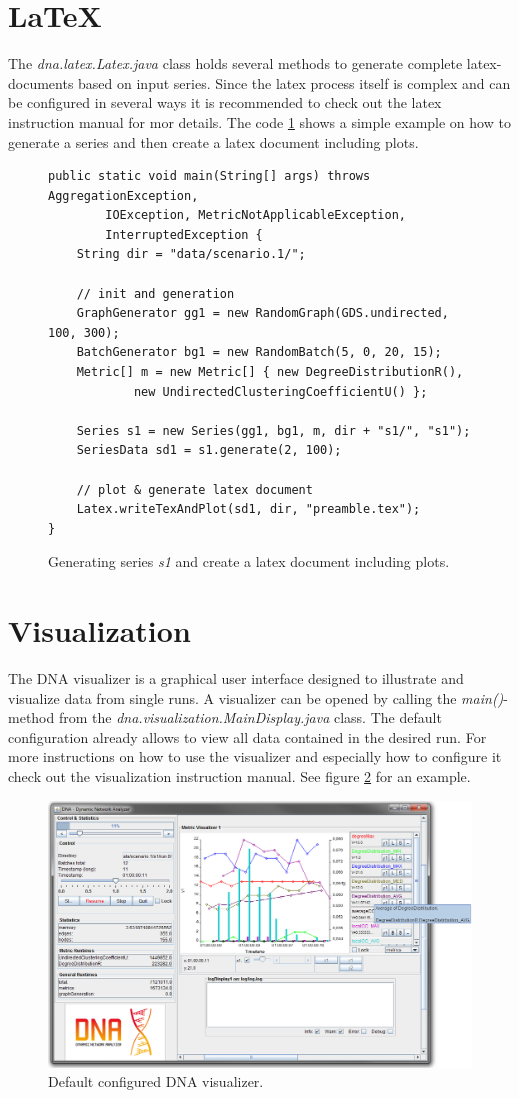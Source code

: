 \section{LaTeX}
The \textit{dna.latex.Latex.java} class holds several methods to generate complete latex-documents based on input series. Since the latex process itself is complex and can be configured in several ways it is recommended to check out the latex instruction manual for mor details. The code \ref{code:tex-example} shows a simple example on how to generate a series and then create a latex document including plots.
\begin{figure} [h]
\begin{lstlisting}
public static void main(String[] args) throws AggregationException,
		IOException, MetricNotApplicableException,
		InterruptedException {
	String dir = "data/scenario.1/";
	
	// init and generation
	GraphGenerator gg1 = new RandomGraph(GDS.undirected, 100, 300);
	BatchGenerator bg1 = new RandomBatch(5, 0, 20, 15);
	Metric[] m = new Metric[] { new DegreeDistributionR(),
			new UndirectedClusteringCoefficientU() };

	Series s1 = new Series(gg1, bg1, m, dir + "s1/", "s1");
	SeriesData sd1 = s1.generate(2, 100);

	// plot & generate latex document
	Latex.writeTexAndPlot(sd1, dir, "preamble.tex");
}
\end{lstlisting}
\caption{Generating series \textit{s1} and create a latex document including plots.}
\label{code:tex-example}
\end{figure}

\section{Visualization}
The DNA visualizer is a graphical user interface designed to illustrate and visualize data from single runs. A visualizer can be opened by calling the \textit{main()}-method from the \textit{dna.visualization.MainDisplay.java} class. The default configuration already allows to view all data contained in the desired run. For more instructions on how to use the visualizer and especially how to configure it check out the visualization instruction manual. See figure \ref{fig:vis} for an example.

\begin{figure} [h]
\centering
\includegraphics [scale=0.5] {images/vis-ex}
\caption{Default configured DNA visualizer.}
\label{fig:vis}
\end{figure}